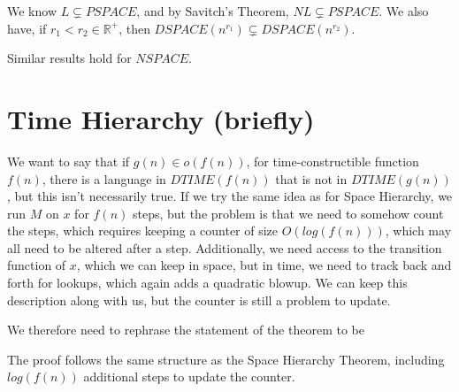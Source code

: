 \documentclass[twoside]{article}
\begin{document}
We know $L\subsetneq PSPACE$, and by Savitch's Theorem, $NL\subsetneq PSPACE$.  We also have, if $r_1<r_2\in \mathbb{R}^+$, then $DSPACE(n^{r_1}) \subsetneq DSPACE(n^{r_2})$.

Similar results hold for $NSPACE$.

\section*{Time Hierarchy (briefly)}

We want to say that if $g(n)\in o(f(n))$, for time-constructible function $f(n)$, there is a language in $DTIME(f(n))$ that is not in $DTIME(g(n))$, but this isn't necessarily true.  If we try the same idea as for Space Hierarchy, we run $M$ on $x$ for $f(n)$ steps, but the problem is that we need to somehow count the steps, which requires keeping a counter of size $O(log(f(n)))$, which may all need to be altered after a step.  Additionally, we need access to the transition function of $x$, which we can keep in space, but in time, we need to track back and forth for lookups, which again adds a quadratic blowup.  We can keep this description along with us, but the counter is still a problem to update.  

We therefore need to rephrase the statement of the theorem to be


The proof follows the same structure as the Space Hierarchy Theorem, including $log(f(n))$ additional steps to update the counter.
\end{document}
